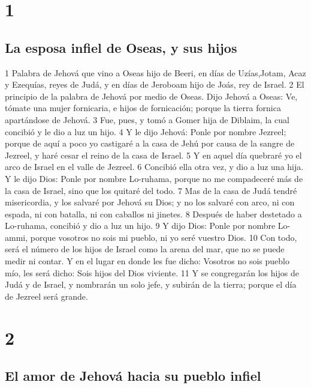 
\chapter{1}

\section*{La esposa infiel de Oseas, y sus hijos}

1 Palabra de Jehová que vino a Oseas hijo de Beeri, en días de Uzías,Jotam, Acaz y Ezequías, reyes de Judá, y en días de Jeroboam hijo de Joás, rey de Israel.
2 El principio de la palabra de Jehová por medio de Oseas. Dijo Jehová a Oseas: Ve, tómate una mujer fornicaria, e hijos de fornicación; porque la tierra fornica apartándose de Jehová.
3 Fue, pues, y tomó a Gomer hija de Diblaim, la cual concibió y le dio a luz un hijo.
4 Y le dijo Jehová: Ponle por nombre Jezreel; porque de aquí a poco yo castigaré a la casa de Jehú por causa de la sangre de Jezreel, y haré cesar el reino de la casa de Israel.
5 Y en aquel día quebraré yo el arco de Israel en el valle de Jezreel.
6 Concibió ella otra vez, y dio a luz una hija. Y le dijo Dios: Ponle por nombre Lo-ruhama, porque no me compadeceré más de la casa de Israel, sino que los quitaré del todo.
7 Mas de la casa de Judá tendré misericordia, y los salvaré por Jehová su Dios; y no los salvaré con arco, ni con espada, ni con batalla, ni con caballos ni jinetes. 
8 Después de haber destetado a Lo-ruhama, concibió y dio a luz un hijo.
9 Y dijo Dios: Ponle por nombre Lo-ammi, porque vosotros no sois mi pueblo, ni yo seré vuestro Dios.
10 Con todo, será el número de los hijos de Israel como la arena del mar, que no se puede medir ni contar. Y en el lugar en donde les fue dicho: Vosotros no sois pueblo mío, les será dicho: Sois hijos del Dios viviente. 
11 Y se congregarán los hijos de Judá y de Israel, y nombrarán un solo jefe, y subirán de la tierra; porque el día de Jezreel será grande.

\chapter{2}

\section*{El amor de Jehová hacia su pueblo infiel}

